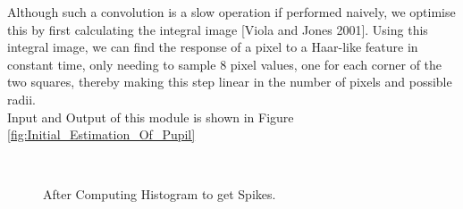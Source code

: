 \documentclass[12pt,fleqn]{book} %
\begin{document}
Although such a convolution is a slow operation if performed naively, we optimise this by first calculating the integral image [Viola and Jones 2001]. Using this integral image, we can find the response of a pixel to a Haar-like feature in constant time, only needing to sample 8 pixel values, one for each corner of the two squares, thereby making this step linear in the number of pixels and possible radii. \\
Input and Output of this module is shown in Figure \ref{fig:Initial_Estimation_Of_Pupil}

\begin{figure}[]
\begin{dBox}
\centering
  \mbox{
   }
   \caption{After Computing Histogram to get Spikes. 
   \label{fig:HistogramOnEyeImage} }   
\end{dBox}   
\end{figure}
\end{document}
